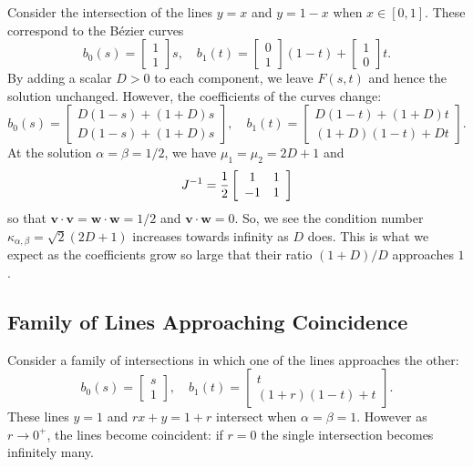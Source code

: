 \documentclass[3p, authoryear, square]{elsarticle}
\theoremstyle{definition}
\begin{document}
Consider the intersection of the lines \(y = x\) and \(y = 1 - x\) when
\(x \in \left[0, 1\right]\). These correspond to the B\'{e}zier curves
\begin{equation}
b_0(s) = \left[ \begin{array}{c} 1 \\ 1 \end{array}\right] s, \quad
b_1(t) = \left[ \begin{array}{c} 0 \\ 1 \end{array}\right] (1 - t) +
\left[ \begin{array}{c} 1 \\ 0 \end{array}\right] t.
\end{equation}
By adding a scalar \(D > 0\) to each component, we leave \(F(s, t)\) and hence
the solution unchanged. However, the coefficients of the curves change:
\begin{equation}
b_0(s) = \left[ \begin{array}{c} D(1 - s) + (1 + D)s \\ D(1 - s) + (1 + D)s
  \end{array}\right], \quad b_1(t) = \left[ \begin{array}{c}
  D(1 - t) + (1 + D)t \\ (1 + D)(1 - t) + Dt \end{array}\right].
\end{equation}
At the solution \(\alpha = \beta = 1/2\), we have \(\mu_1 = \mu_2 = 2D + 1\)
and
\begin{equation}
J^{-1} = \frac{1}{2}
\left[ \begin{array}{c c} 1 & 1 \\ -1 & 1 \end{array}\right]
\end{equation}
so that \(\bm{v} \cdot \bm{v} = \bm{w} \cdot \bm{w} =
1/2\) and \(\bm{v} \cdot \bm{w} = 0\).
So, we see the condition number \(\kappa_{\alpha, \beta} = \sqrt{2}(2D + 1)\)
increases towards infinity as \(D\) does. This is what we expect as the
coefficients grow so large that their ratio \((1 + D) / D\) approaches \(1\).

\subsection{Family of Lines Approaching Coincidence}

Consider a family of intersections in which one of the lines approaches the
other:
\begin{equation}
b_0(s) = \left[ \begin{array}{c} s \\ 1 \end{array}\right], \quad
b_1(t) = \left[ \begin{array}{c} t \\ (1 + r)(1 - t) + t \end{array}\right].
\end{equation}
These lines \(y = 1\) and \(rx + y = 1 + r\) intersect when
\(\alpha = \beta = 1\). However as \(r \longrightarrow 0^+\), the lines
become coincident: if \(r = 0\) the single intersection becomes infinitely
many.
\end{document}

